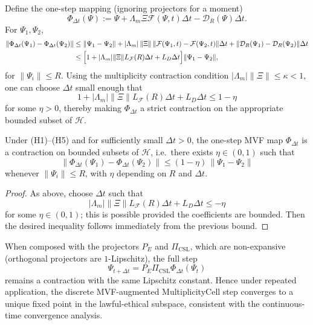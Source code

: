 \documentclass[11pt]{article}
\begin{document}
Define the one-step mapping (ignoring projectors for a moment)
\[
  \Phi_{\Delta t}(\Psi)
  :=
  \Psi + \Lambda_m\Xi \mathcal{F}(\Psi,t)\Delta t - \mathcal{D}_R(\Psi)\Delta t.
\]
For $\Psi_1,\Psi_2$,
\[
  \begin{aligned}
  \|\Phi_{\Delta t}(\Psi_1)-\Phi_{\Delta t}(\Psi_2)\|
  &\le
  \|\Psi_1-\Psi_2\|
  + |\Lambda_m|\,\|\Xi\|\,\|\mathcal{F}(\Psi_1,t)-\mathcal{F}(\Psi_2,t)\|\Delta t
  + \|\mathcal{D}_R(\Psi_1)-\mathcal{D}_R(\Psi_2)\|\Delta t \\
  &\le
  \Bigl[
    1 +
    |\Lambda_m|\|\Xi\| L_{\mathcal{F}}(R)\Delta t
    + L_D \Delta t
  \Bigr]\|\Psi_1-\Psi_2\|,
  \end{aligned}
\]
for $\|\Psi_i\|\le R$. Using the multiplicity contraction condition $|\Lambda_m|\|\Xi\|\le \kappa<1$, one can choose $\Delta t$ small enough that
\[
  1 + |\Lambda_m|\|\Xi\| L_{\mathcal{F}}(R)\Delta t + L_D \Delta t
  \le
  1 - \eta
\]
for some $\eta>0$, thereby making $\Phi_{\Delta t}$ a strict contraction on the appropriate bounded subset of $\mathcal{H}$.

\begin{proposition}
Under (H1)--(H5) and for sufficiently small $\Delta t>0$, the one-step MVF map $\Phi_{\Delta t}$ is a contraction on bounded subsets of $\mathcal{H}$, i.e.\ there exists $\eta\in(0,1)$ such that
\[
  \|\Phi_{\Delta t}(\Psi_1)-\Phi_{\Delta t}(\Psi_2)\|
  \le
  (1-\eta)\,\|\Psi_1-\Psi_2\|
\]
whenever $\|\Psi_i\|\le R$, with $\eta$ depending on $R$ and $\Delta t$.
\end{proposition}

\begin{proof}
As above, choose $\Delta t$ such that
\[
  |\Lambda_m|\|\Xi\| L_{\mathcal{F}}(R)\Delta t + L_D \Delta t \le -\eta
\]
for some $\eta\in(0,1)$; this is possible provided the coefficients are bounded. Then the desired inequality follows immediately from the previous bound.
\end{proof}

When composed with the projectors $P_E$ and $\Pi_{\mathrm{CSL}}$, which are non-expansive (orthogonal projectors are $1$-Lipschitz), the full step
\[
  \Psi_{t+\Delta t}
  = P_E \Pi_{\mathrm{CSL}}\Phi_{\Delta t}(\Psi_t)
\]
remains a contraction with the same Lipschitz constant. Hence under repeated application, the discrete MVF-augmented MultiplicityCell step converges to a unique fixed point in the lawful-ethical subspace, consistent with the continuous-time convergence analysis.
\end{document}
